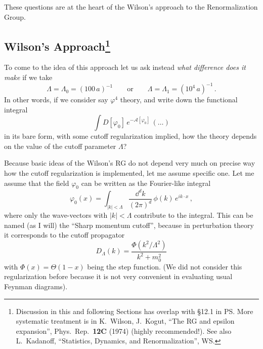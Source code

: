 These questions are at the heart of the Wilson's approach to the Renormalization
Group.

\subsection*{Wilson's Approach\protect\footnote{Discussion in this and following
Sections has overlap with \S12.1 in PS. More systematic treatment is in K.~Wilson,
J.~Kogut, ``The RG and epsilon expansion'', Phys.\ Rep.\ \textbf{12C} (1974)
(highly recommended!). See also L.~Kadanoff, ``Statistics, Dynamics, and
Renormalization'', WS.}}

To come to the idea of this approach let us ask instead \emph{what difference
does it make} if we take
\[
\Lambda=\Lambda_0=(100\,a)^{-1}\qquad\text{or}\qquad\Lambda=\Lambda_1=(10^4\,a)^{-1}\,.
\]
In other words, if we consider say $\varphi^4$ theory, and write down the
functional integral
\[
\int D[\varphi_0]\,e^{-\mathcal A[\varphi_0]}\,(\dots)
\]
in its bare form, with some cutoff regularization implied, how the theory depends
on the value of the cutoff parameter $\Lambda$?

Because basic ideas of the Wilson's RG do not depend very much on precise way how
the cutoff regularization is implemented, let me assume specific one. Let me
assume that the field $\varphi_0$ can be written as the Fourier-like integral
\[
\varphi_0(x)=\int_{|k|<\Lambda}\frac{\dd^dk}{(2\pi)^d}\,\phi(k)\,e^{ik\cdot x}\,,
\]
where only the wave-vectors with $|k|<\Lambda$ contribute to the integral. This
can be named (as I will) the ``Sharp momentum cutoff'', because in perturbation
theory it corresponds to the cutoff propagator
\[
D_\Lambda(k)=\frac{\Phi(k^2/\Lambda^2)}{k^2+m_0^2}
\]
with $\Phi(x)=\Theta(1-x)$ being the step function. (We did not consider this
regularization before because it is not very convenient in evaluating usual
Feynman diagrams).

